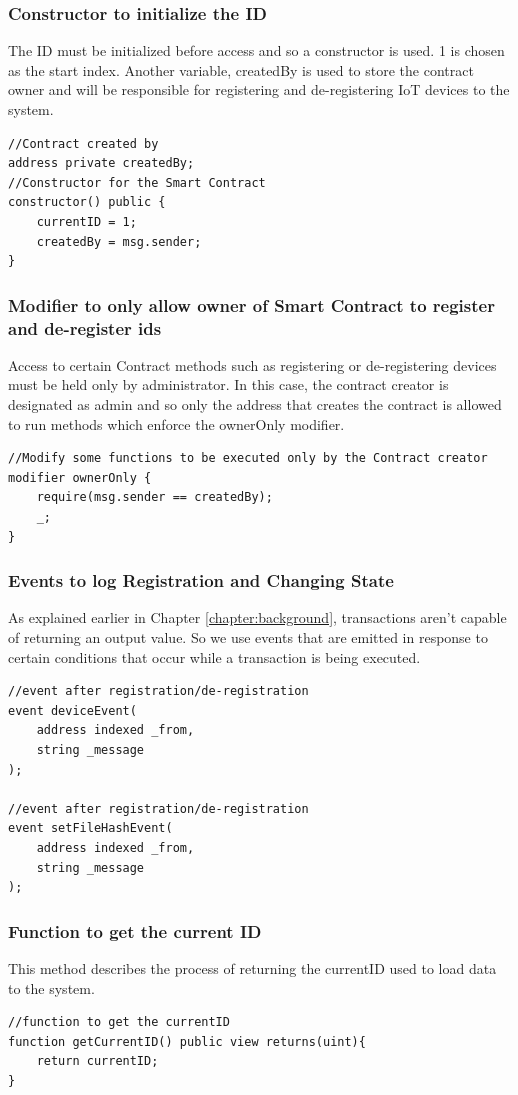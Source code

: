 \documentclass[11pt,openright]{report}
\begin{document}
\subsubsection{Constructor to initialize the ID}
The ID must be initialized before access and so a constructor is used. 1  is chosen as the start index. Another variable, createdBy is used to store the contract owner and will be responsible for registering and de-registering IoT devices to the system.
\begin{lstlisting}
//Contract created by
address private createdBy;
//Constructor for the Smart Contract
constructor() public {
    currentID = 1;
    createdBy = msg.sender;
}
\end{lstlisting}

\subsubsection{Modifier to only allow owner of Smart Contract to register and de-register ids}
Access to certain Contract methods such as registering or de-registering devices must be held only by administrator. In this case, the contract creator is designated as admin and so only the address that creates the contract is allowed to run methods which enforce the ownerOnly modifier.
\begin{lstlisting}
//Modify some functions to be executed only by the Contract creator
modifier ownerOnly {
    require(msg.sender == createdBy);
    _;
}
\end{lstlisting}

\subsubsection{Events to log Registration and Changing State}
As explained earlier in Chapter \ref{chapter:background}, transactions aren't capable of returning an output value. So we use events that are emitted in response to certain conditions that occur while a transaction is being executed.

\begin{lstlisting}
//event after registration/de-registration
event deviceEvent(
    address indexed _from,
    string _message
);

//event after registration/de-registration
event setFileHashEvent(
    address indexed _from,
    string _message
);
\end{lstlisting}

\subsubsection{Function to get the current ID}
This method describes the process of returning the currentID used to load data to the system.
\begin{lstlisting}
//function to get the currentID
function getCurrentID() public view returns(uint){
    return currentID;
}
\end{lstlisting}
\end{document}
